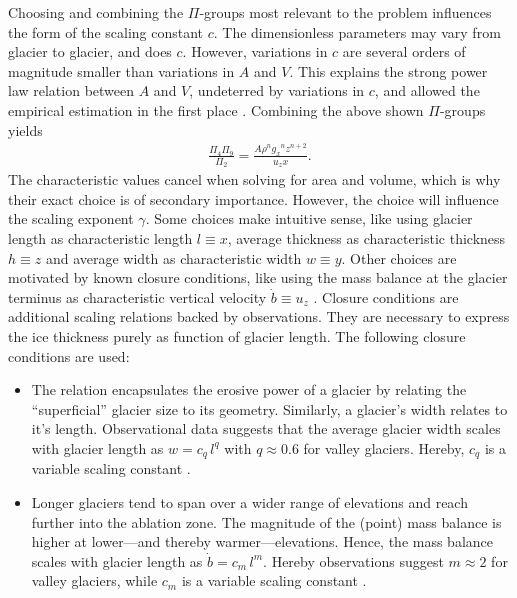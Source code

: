             Choosing and combining the $\Pi$-groups most relevant to the problem influences the form of the scaling constant $c$. The dimensionless parameters may vary from glacier to glacier, and does $c$. However,  variations in $c$ are several orders of magnitude smaller than variations in $A$ and $V$. This explains the strong power law relation between $A$ and $V$, undeterred by variations in $c$, and allowed the empirical estimation in the first place \citep{Bahr2015}. Combining the above shown $\Pi$-groups yields
            \begin{align}\label{eq:pi_groups_combi}
                \frac{\Pi_4 \Pi_9}{\Pi_2} = \frac{A\rho^n{g_x}^nz^{n+2}}{u_z x}.
            \end{align}
            The characteristic values cancel when solving for area and volume, which is why their exact choice is of secondary importance. However, the choice will influence the scaling exponent $\gamma$. Some choices make intuitive sense, like using glacier length as characteristic length $l \equiv x$, average thickness as characteristic thickness $h \equiv z$ and average width as characteristic width $w \equiv y$. Other choices are motivated by known closure conditions, like using the mass balance at the glacier terminus as characteristic vertical velocity $\dot b \equiv u_z$ \citep{Bahr2015}. Closure conditions are additional scaling relations backed by observations. They are necessary to express the ice thickness purely as function of glacier length. The following closure conditions are used:
            \begin{itemize}
                \item The \vas{} relation encapsulates the erosive power of a glacier by relating the ``superficial'' glacier size to its geometry. Similarly, a glacier's width relates to it's length. Observational data suggests that the average glacier width scales with glacier length as $w=c_q\, l^q$ with $q\approx 0.6$ for valley glaciers. Hereby, $c_q$ is a variable scaling constant \citep{Bahr1997a, Bahr2015}.
                \item Longer glaciers tend to span over a wider range of elevations and reach further into the ablation zone. The magnitude of the (point) mass balance is higher at lower---and thereby warmer---elevations. Hence, the mass balance scales with glacier length as $\dot b = c_m\, l^m$. Hereby observations suggest $m\approx 2$ for valley glaciers, while $c_m$ is a variable scaling constant \citep{Bahr1997b, Bahr2015}.
            \end{itemize}
